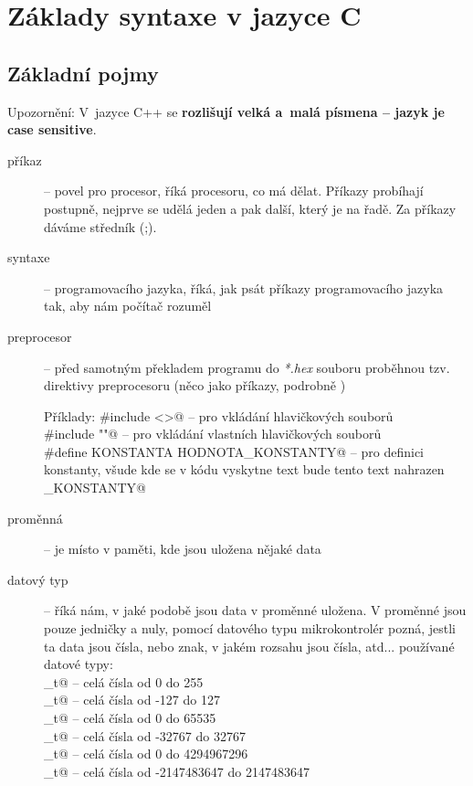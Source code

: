 \section{Základy syntaxe v jazyce C}

\subsection{Základní pojmy}

\label{cpp} Upozornění: V~jazyce C++ se {\bf rozlišují velká a~malá písmena -- jazyk je case sensitive}.  

\begin{description}

\item[příkaz]  -- povel pro procesor, říká procesoru, co má dělat.
Příkazy probíhají postupně, nejprve se udělá jeden a pak další, který je na řadě.
Za příkazy dáváme středník (;).

\item[syntaxe] --  programovacího jazyka, říká, jak psát příkazy programovacího jazyka tak, aby nám počítač rozuměl 

\item[preprocesor] -- před samotným překladem programu do \textit{*.hex} souboru proběhnou tzv. direktivy preprocesoru (něco jako příkazy, podrobně )


Příklady: \verb@#include <>@ -- pro vkládání hlavičkových souborů \\
 \verb@#include ""@ -- pro vkládání vlastních hlavičkových souborů \\
 \verb@#define KONSTANTA HODNOTA_KONSTANTY@ -- pro definici konstanty, všude kde se v kódu vyskytne text \verb@KONSTANTA@ bude tento text nahrazen\\  \verb@HODNOTA_KONSTANTY@

\item[proměnná]   -- je místo v paměti, kde jsou uložena nějaké data

\item[datový typ]\label{data1}  -- říká nám, v jaké podobě jsou data v proměnné uložena. V proměnné jsou pouze jedničky a nuly, pomocí datového typu mikrokontrolér pozná, jestli ta data jsou čísla, nebo znak, v jakém rozsahu jsou čísla, atd...
používané datové typy:   \\
_t@ -- celá čísla od 0 do 255  \\  
_t@ -- celá čísla od -127 do 127 \\
_t@ --  celá čísla od 0 do 65535  \\
_t@ -- celá čísla od -32767 do 32767 \\
_t@ -- celá čísla od 0 do 4294967296 \\
_t@ -- celá čísla od -2147483647 do 2147483647 \\


\end{description}
